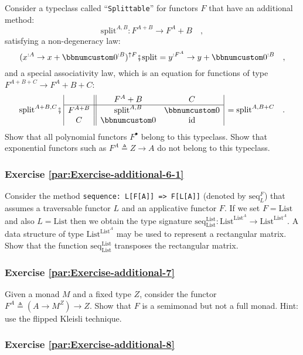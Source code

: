 Consider a typeclass called \textsf{``}\lstinline!Splittable!\textsf{''} for functors
$F$ that have an additional method:
\[
\text{split}^{A,B}:F^{A+B}\rightarrow F^{A}+B\quad,
\]
satisfying a non-degeneracy
law:
\[
(x^{:A}\rightarrow x+\bbnum 0^{:B})^{\uparrow F}\bef\text{split}=y^{:F^{A}}\rightarrow y+\bbnum 0^{:B}\quad,
\]
and a special associativity law,
which is an equation for functions of type $F^{A+B+C}\rightarrow F^{A}+B+C$:
\[
\text{split}^{A+B,C}\bef\,\begin{array}{|c||cc|}
 & F^{A}+B & C\\
\hline F^{A+B} & \text{split}^{A,B} & \bbnum 0\\
C & \bbnum 0 & \text{id}
\end{array}\,=\text{split}^{A,B+C}\quad.
\]
Show that all polynomial functors $F^{\bullet}$ belong to this typeclass.
Show that exponential functors such as $F^{A}\triangleq Z\rightarrow A$
do not belong to this typeclass.

\subsubsection{Exercise \label{par:Exercise-additional-6-1}\ref{par:Exercise-additional-6-1}}

Consider the method \lstinline!sequence: L[F[A]] => F[L[A]]! (denoted
by $\text{seq}_{L}^{F}$) that assumes a traversable functor $L$
and an applicative functor $F$. If we set $F=\text{List}$ and also
$L=\text{List}$ then we obtain the type signature $\text{seq}_{\text{List}}^{\text{List}}:\text{List}^{\text{List}^{A}}\rightarrow\text{List}^{\text{List}^{A}}$.
A data structure of type $\text{List}^{\text{List}^{A}}$ may be used
to represent a rectangular matrix. Show that the function $\text{seq}_{\text{List}}^{\text{List}}$
transposes the rectangular matrix.

\subsubsection{Exercise \label{par:Exercise-additional-7}\ref{par:Exercise-additional-7}}

Given a monad $M$ and a fixed type $Z$, consider the functor $F^{A}\triangleq(A\rightarrow M^{Z})\rightarrow Z$.
Show that $F$ is a semimonad but not a full monad. Hint: use the
flipped Kleisli technique.

\subsubsection{Exercise \label{par:Exercise-additional-8}\ref{par:Exercise-additional-8}}

